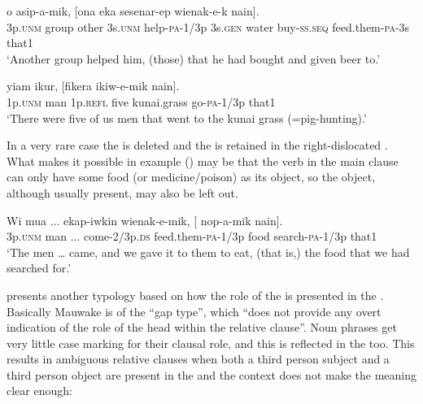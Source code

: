 \ea%
\label{ex:x1533}
\gll {}      o  asip-a-mik,  [ona  eka sesenar-ep  wienak-e-k  nain]. \\
3p.\textsc{unm} group  other  3s.\textsc{unm} help-\textsc{pa}-1/3p  3s.\textsc{gen} water buy-\textsc{ss}.\textsc{seq} feed.them-\textsc{pa}-3s that1\\
\glt`Another group helped him, (those) that he had bought and given beer to.'
\z


\ea%
\label{ex:x1534}
\gll {}   yiam  ikur,  [fikera  ikiw-e-mik  nain]. \\
1p.\textsc{unm} man 1p.\textsc{refl} five kunai.grass go-\textsc{pa}-1/3p that1\\
\glt`There were five of us men that went to the kunai grass (=pig-hunting).'
\z


In a very rare case the  is deleted and the  is retained in the right-dislocated . What makes it possible in example () may be that the verb in the main clause can only have some food (or medicine/poison) as its object, so the object, although usually present, may also be left out.

\ea%
\label{ex:x1535}
\gll Wi  mua  ...  ekap-iwkin  wienak-e-mik, [  nop-a-mik  nain].\\
3p.\textsc{unm} man  ...  come-2/3p.\textsc{ds} feed.them-\textsc{pa}-1/3p food  search-\textsc{pa}-1/3p  that1\\
\glt`The men {\dots} came, and we gave it to them to eat, (that is,) the food that we had searched for.'
\z


\citet[144--146]{Comrie1981} presents another typology based on how the role of the  is presented in the . Basically Mauwake is of the ``gap type'', which ``does not provide any overt indication of the role of the head within the relative clause''. Noun phrases get very little case marking for their clausal role, and this is reflected in the  too. This results in ambiguous relative clauses when both a third person subject  and a third person object  are present in the  and the context does not make the meaning clear enough:

